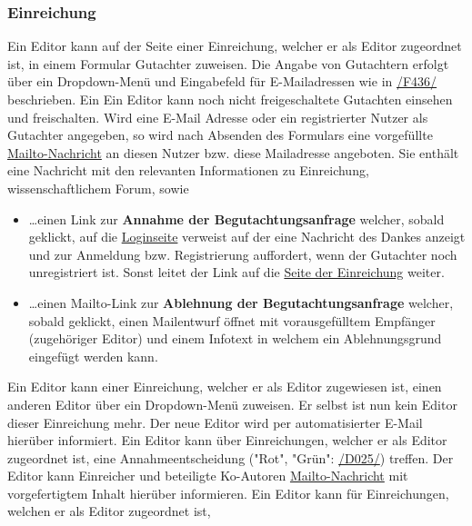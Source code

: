 \subsubsection{Einreichung}\label{ed:ein}
\begin{description}
     Ein Editor kann auf der Seite einer Einreichung, welcher er als Editor zugeordnet ist,
    in einem Formular Gutachter zuweisen. Die Angabe von Gutachtern erfolgt über ein Dropdown-Menü und Eingabefeld für E-Mailadressen
    wie in \hyperref[funkt:436]{/F436/} beschrieben.
     Ein Ein Editor kann noch nicht freigeschaltete Gutachten einsehen und freischalten.
     Wird eine E-Mail Adresse oder ein registrierter Nutzer als Gutachter angegeben,
    so wird nach Absenden des Formulars eine vorgefüllte \hyperref[glo:mailto]{Mailto-Nachricht} an diesen Nutzer bzw. diese Mailadresse angeboten.
    Sie enthält eine Nachricht mit den relevanten Informationen zu Einreichung, wissenschaftlichem Forum, sowie
    \begin{itemize}
        \item \ldots einen Link zur \textbf{Annahme der Begutachtungsanfrage} welcher, sobald geklickt,
        auf die \hyperref[an:log]{Loginseite} verweist auf der eine Nachricht des Dankes anzeigt und zur Anmeldung bzw.
        Registrierung auffordert, wenn der Gutachter noch unregistriert ist. Sonst leitet der Link auf die
        \hyperref[nut:ein]{Seite der Einreichung} weiter.
        \item \ldots einen Mailto-Link zur \textbf{Ablehnung der Begutachtungsanfrage} welcher, sobald
        geklickt, einen Mailentwurf öffnet mit vorausgefülltem Empfänger (zugehöriger Editor)
        und einem Infotext in welchem ein Ablehnungsgrund eingefügt werden kann.
    \end{itemize}
     Ein Editor kann einer Einreichung, welcher er als Editor zugewiesen ist, einen anderen Editor
    über ein Dropdown-Menü zuweisen. Er selbst ist nun kein Editor dieser Einreichung mehr. Der neue Editor wird per
    automatisierter E-Mail hierüber informiert.
     Ein Editor kann über Einreichungen, welcher er als Editor zugeordnet ist,
    eine Annahmeentscheidung ("Rot", "Grün": \hyperref[d025]{/D025/}) treffen.
    Der Editor kann Einreicher und beteiligte Ko-Autoren \hyperref[glo:mailto]{Mailto-Nachricht} mit vorgefertigtem Inhalt
    hierüber informieren.
     Ein Editor kann für Einreichungen, welchen er als Editor zugeordnet ist,

\end{description}
